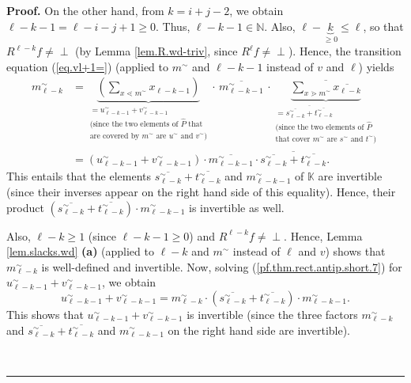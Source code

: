 \documentclass[numbers=enddot,12pt,final,onecolumn,notitlepage]{scrartcl}%
\theoremstyle{definition}
\newenvironment{vershort}{}{}
\newcommand{\undf}{\operatorname*{\bot}}
\newenvironment{proof}[1][Proof]{\noindent\textbf{#1.} }{\ \rule{0.5em}{0.5em}}
\let\sumnonlimits\sum
\renewcommand{\sum}{\sumnonlimits\limits}
\begin{document}
\begin{vershort}
\begin{proof}
On the other hand, from $k=i+j-2$, we obtain $\ell-k-1=\ell-i-j+1\geq0$. Thus,
$\ell-k-1\in\mathbb{N}$. Also, $\ell-\underbrace{k}_{\geq0}\leq\ell$, so that
$R^{\ell-k}f\neq\undf$ (by Lemma \ref{lem.R.wd-triv}, since $R^{\ell}%
f\neq\undf$). Hence, the transition equation (\ref{eq.vl+1=}) (applied to
$m^{\sim}$ and $\ell-k-1$ instead of $v$ and $\ell$) yields%
\begin{align}
m_{\ell-k}^{\sim}  &  =\underbrace{\left(  \sum_{x\lessdot m^{\sim}}%
x_{\ell-k-1}\right)  }_{\substack{=u_{\ell-k-1}^{\sim}+v_{\ell-k-1}^{\sim
}\\\text{(since the two elements of }\widehat{P}\text{ that}\\\text{are
covered by }m^{\sim}\text{ are }u^{\sim}\text{ and }v^{\sim}\text{)}}%
}\cdot\,\overline{m_{\ell-k-1}^{\sim}}\,\cdot\underbrace{\overline
{\sum_{x\gtrdot m^{\sim}}\overline{x_{\ell-k}}}}_{\substack{=\overline
{\overline{s_{\ell-k}^{\sim}}+\overline{t_{\ell-k}^{\sim}}}\\\text{(since the
two elements of }\widehat{P}\\\text{that cover }m^{\sim}\text{ are }s^{\sim
}\text{ and }t^{\sim}\text{)}}}\nonumber\\
&  =\left(  u_{\ell-k-1}^{\sim}+v_{\ell-k-1}^{\sim}\right)  \cdot
\overline{m_{\ell-k-1}^{\sim}}\cdot\overline{\overline{s_{\ell-k}^{\sim}%
}+\overline{t_{\ell-k}^{\sim}}}. \label{pf.thm.rect.antip.short.7}%
\end{align}
This entails that the elements $\overline{s_{\ell-k}^{\sim}}+\overline
{t_{\ell-k}^{\sim}}$ and $m_{\ell-k-1}^{\sim}$ of $\mathbb{K}$ are invertible
(since their inverses appear on the right hand side of this equality). Hence,
their product $\left(  \overline{s_{\ell-k}^{\sim}}+\overline{t_{\ell-k}%
^{\sim}}\right)  \cdot m_{\ell-k-1}^{\sim}$ is invertible as well.

Also, $\ell-k\geq1$ (since $\ell-k-1\geq0$) and $R^{\ell-k}f\neq\undf$. Hence,
Lemma \ref{lem.slacks.wd} \textbf{(a)} (applied to $\ell-k$ and $m^{\sim}$
instead of $\ell$ and $v$) shows that $m_{\ell-k}^{\sim}$ is well-defined and
invertible. Now, solving (\ref{pf.thm.rect.antip.short.7}) for $u_{\ell
-k-1}^{\sim}+v_{\ell-k-1}^{\sim}$, we obtain%
\[
u_{\ell-k-1}^{\sim}+v_{\ell-k-1}^{\sim}=m_{\ell-k}^{\sim}\cdot\left(
\overline{s_{\ell-k}^{\sim}}+\overline{t_{\ell-k}^{\sim}}\right)  \cdot
m_{\ell-k-1}^{\sim}.
\]
This shows that $u_{\ell-k-1}^{\sim}+v_{\ell-k-1}^{\sim}$ is invertible (since
the three factors $m_{\ell-k}^{\sim}$ and $\overline{s_{\ell-k}^{\sim}%
}+\overline{t_{\ell-k}^{\sim}}$ and $m_{\ell-k-1}^{\sim}$ on the right hand
side are invertible).


\end{proof}
\end{vershort}
\end{document}
